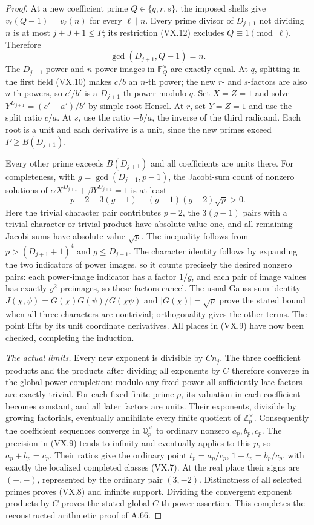 \begin{proof}
At a new coefficient prime \(Q\in\{q,r,s\}\),
the imposed shells give
\(v_\ell(Q-1)=v_\ell(n)\) for every
\(\ell\mid n\). Every prime divisor of
\(D_{j+1}\) not dividing \(n\) is at most
\(j+J+1\le P\); its restriction (VX.12)
excludes \(Q\equiv1\pmod\ell\). Therefore
\[
              \gcd(D_{j+1},Q-1)=n.
 \tag{VX.17}
\]
The \(D_{j+1}\)-power and \(n\)-power images
in \(\mathbb F_Q^\times\) are exactly equal.
At \(q\), splitting in the first field
(VX.10) makes \(c/b\) an \(n\)-th power;
the new \(r\)- and \(s\)-factors are also
\(n\)-th powers, so \(c'/b'\) is a
\(D_{j+1}\)-th power modulo \(q\).
Set \(X=Z=1\) and solve
\(Y^{D_{j+1}}=(c'-a')/b'\) by simple-root
Hensel. At \(r\), set \(Y=Z=1\) and use
the split ratio \(c/a\). At \(s\), use
the ratio \(-b/a\), the inverse of the
third radicand. Each root is a unit and
each derivative is a unit, since the new
primes exceed \(P\ge B(D_{j+1})\).

Every other prime exceeds \(B(D_{j+1})\)
and all coefficients are units there.
For completeness, with \(g=\gcd(D_{j+1},p-1)\),
the Jacobi-sum count of nonzero solutions of
\(\alpha X^{D_{j+1}}+\beta Y^{D_{j+1}}=1\)
is at least
\[
 p-2-3(g-1)-(g-1)(g-2)\sqrt p>0.
 \tag{VX.18}
\]
Here the trivial character pair contributes
\(p-2\), the \(3(g-1)\) pairs with a
trivial character or trivial product have
absolute value one, and all remaining
Jacobi sums have absolute value \(\sqrt p\).
The inequality follows from
\(p>(D_{j+1}+1)^4\) and \(g\le D_{j+1}\).
The character identity follows by expanding
the two indicators of power images, so it
counts precisely the desired nonzero pairs: each power-image
indicator has a factor \(1/g\), and each pair of image
values has exactly \(g^2\) preimages, so these factors
cancel.
The usual Gauss-sum identity
\(J(\chi,\psi)=G(\chi)G(\psi)/G(\chi\psi)\)
and \(|G(\chi)|=\sqrt p\) prove the stated
bound when all three characters are nontrivial;
orthogonality gives the other terms.
The point lifts by its unit coordinate
derivatives. All places in (VX.9) have now
been checked, completing the induction.

\emph{The actual limits.}
Every new exponent is divisible by \(Cn_j\).
The three coefficient products and the
products after dividing all exponents by
\(C\) therefore converge in the global
power completion: modulo any fixed power
all sufficiently late factors are exactly
trivial. For each fixed finite prime \(p\),
its valuation in each coefficient becomes
constant, and all later factors are units.
Their exponents, divisible by growing
factorials, eventually annihilate every
finite quotient of \(\mathbb Z_p^\times\).
Consequently the coefficient sequences
converge in \(\mathbb Q_p^\times\) to
ordinary nonzero \(a_p,b_p,c_p\).
The precision in (VX.9) tends to infinity
and eventually applies to this \(p\),
so \(a_p+b_p=c_p\). Their ratios give
the ordinary point \(t_p=a_p/c_p\),
\(1-t_p=b_p/c_p\), with exactly the
localized completed classes (VX.7).
At the real place their signs are \((+,-)\),
represented by the ordinary pair \((3,-2)\).
Distinctness of all selected primes proves
(VX.8) and infinite support. Dividing the
convergent exponent products by \(C\)
proves the stated global \(C\)-th power
assertion. This completes the reconstructed
arithmetic proof of A.66.
\end{proof}

